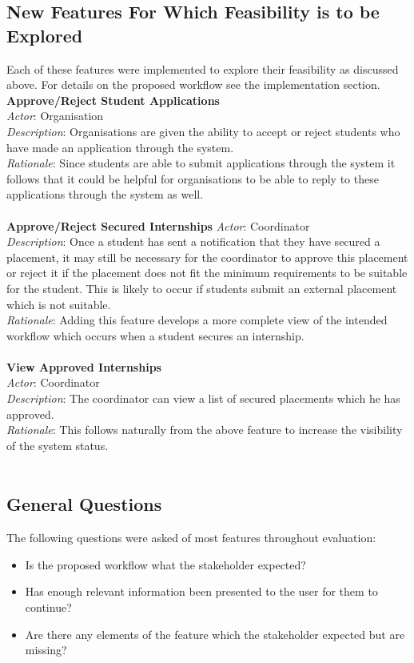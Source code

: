 \documentclass{l3deliverable}
\begin{document}
\subsection{New Features For Which Feasibility is to be Explored}
Each of these features were implemented to explore their feasibility as discussed above. For details on the proposed workflow see the implementation section.\\
\textbf{Approve/Reject Student Applications}\\
\emph{Actor}: Organisation\\
\emph{Description}: Organisations are given the ability to accept or reject students who have made an application through the system.\\
\emph{Rationale}: Since students are able to submit applications through the system it follows that it could be helpful for organisations to be able
to reply to these applications through the system as well.\\
\\
\textbf{Approve/Reject Secured Internships}
\emph{Actor}: Coordinator\\
\emph{Description}: Once a student has sent a notification that they have secured a placement, it may still be necessary for the coordinator to approve this placement or reject it
if the placement does not fit the minimum requirements to be suitable for the student. This is likely to occur if students submit an external placement which is not suitable.\\
\emph{Rationale}: Adding this feature develops a more complete view of the intended workflow which occurs when a student secures an internship.\\
\\
\textbf{View Approved Internships}\\
\emph{Actor}: Coordinator\\
\emph{Description}: The coordinator can view a list of secured placements which he has approved.\\
\emph{Rationale}: This follows naturally from the above feature to increase the visibility of the system status.\\
\\

\subsection{General Questions}
The following questions were asked of most features throughout evaluation:
\begin{itemize}
\item{Is the proposed workflow what the stakeholder expected?}
\item{Has enough relevant information been presented to the user for them to continue?}
\item{Are there any elements of the feature which the stakeholder expected but are missing?}
\end{itemize}
\end{document}
